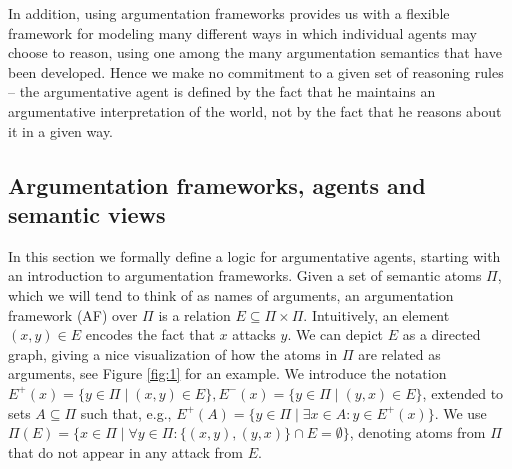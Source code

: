 \documentclass[greybox]{svmult}
\newcommand{\outa}[2]{#1^+(#2)}
\newcommand{\ina}[2]{#1^-(#2)}
\begin{document}
In addition, using argumentation frameworks provides us with a flexible framework for modeling many different ways in which individual agents may choose to reason, using one among the many argumentation semantics that have been developed. Hence we make no commitment to a given set of reasoning rules -- the argumentative agent is defined by the fact that he maintains an argumentative interpretation of the world, not by the fact that he reasons about it in a given way.


\subsection{Argumentation frameworks, agents and semantic views}\label{subsec:arg}

In this section we formally define a logic for argumentative agents, starting with an introduction to argumentation frameworks. Given a set of semantic atoms $\Pi$, which we will tend to think of as names of arguments, an argumentation framework (AF) over $\Pi$ is a relation $E \subseteq \Pi \times \Pi$. Intuitively, an element $(x,y) \in E$ encodes the fact that $x$ attacks $y$. We can depict $E$ as a directed graph, giving a nice visualization of how the atoms in $\Pi$ are related as arguments, see Figure \ref{fig:1} for an example. 
We introduce the notation $\outa E x = \{y \in \Pi \mid (x,y) \in E\}, \ina E x = \{y \in \Pi \mid (y,x) \in E\}$, extended to sets $A \subseteq \Pi$ such that, e.g., $E^+(A) = \{y \in \Pi \mid \exists x \in A: y \in \outa E x\}$. We use $\Pi(E) = \{x \in \Pi \mid \forall y\in \Pi: \{(x,y),(y,x)\} \cap E = \emptyset\}$, denoting atoms from $\Pi$ that do not appear in any attack from $E$.
\end{document}
